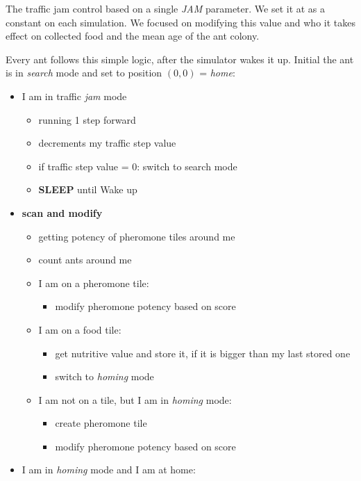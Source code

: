 The traffic jam control based on a single \emph{JAM} parameter. We set
it at as a constant on each simulation. We focused on modifying this
value and who it takes effect on collected food and the mean age of the
ant colony.

Every ant follows this simple logic, after the simulator wakes it up.
Initial the ant is in \emph{search} mode and set to position \((0,0)\) =
\emph{home}:

\begin{itemize}
\tightlist
\item
  I am in traffic \emph{jam} mode

  \begin{itemize}
  \tightlist
  \item
    running 1 step forward
  \item
    decrements my traffic step value
  \item
    if traffic step value = 0: switch to search mode
  \item
    \textbf{SLEEP} until Wake up
  \end{itemize}
\item
  \textbf{scan and modify}

  \begin{itemize}
  \tightlist
  \item
    getting potency of pheromone tiles around me
  \item
    count ants around me
  \item
    I am on a pheromone tile:

    \begin{itemize}
    \tightlist
    \item
      modify pheromone potency based on score
    \end{itemize}
  \item
    I am on a food tile:

    \begin{itemize}
    \tightlist
    \item
      get nutritive value and store it, if it is bigger than my last
      stored one
    \item
      switch to \emph{homing} mode
    \end{itemize}
  \item
    I am not on a tile, but I am in \emph{homing} mode:

    \begin{itemize}
    \tightlist
    \item
      create pheromone tile
    \item
      modify pheromone potency based on score
    \end{itemize}
  \end{itemize}
\item
  I am in \emph{homing} mode and I am at home:


\end{itemize}
